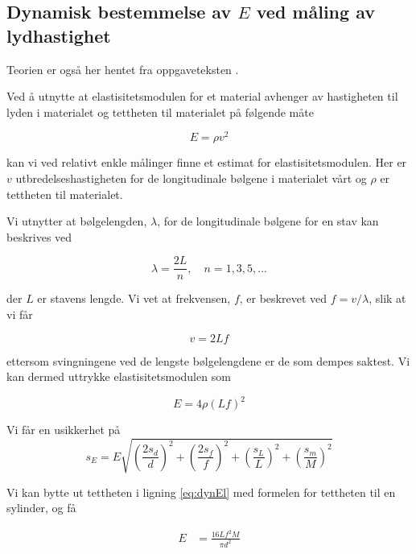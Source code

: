 \documentclass[a4paper,11pt, twocolumn]{article}
\begin{document}
\subsection{Dynamisk bestemmelse av $E$ ved måling av lydhastighet}
Teorien er også her hentet fra oppgaveteksten \cite{oppgavetekst}. 

Ved å utnytte at elastisitetsmodulen for et material avhenger av hastigheten til lyden i materialet og tettheten til materialet på følgende måte

\begin{equation}
	E = \rho v^2
	\label{eq:dynamiskElastisitet}
\end{equation}

kan vi ved relativt enkle målinger finne et estimat for elastisitetsmodulen. Her er $v$ utbredelseshastigheten for de longitudinale bølgene i materialet vårt og $\rho$ er tettheten til materialet.

Vi utnytter at bølgelengden, $\lambda$, for de longitudinale bølgene for en stav kan beskrives ved 

\begin{equation}
	\lambda = \frac{2L}{n}, \quad n = 1, 3, 5, \dots
\end{equation}

der $L$ er stavens lengde. Vi vet at frekvensen, $f$, er beskrevet ved $f = v/\lambda$, slik at vi får 

\begin{equation}
	v = 2Lf
\end{equation}

ettersom svingningene ved de lengste bølgelengdene er de som dempes saktest. Vi kan dermed uttrykke elastisitetsmodulen som

\begin{equation}
	E = 4\rho(Lf)^2
	\label{eq:dynEl}
\end{equation}

Vi får en usikkerhet på
\begin{equation}
	s_E = E\sqrt{\left(\frac{2s_d}{d}\right)^2+\left(\frac{2s_f}{f}\right)^2+\left(\frac{s_L}{L}\right)^2+\left(\frac{s_m}{M}\right)^2}	
	\label{eq:feilDynamisk}
\end{equation}

Vi kan bytte ut tettheten i ligning \eqref{eq:dynEl} med formelen for tettheten til en sylinder, og få

\begin{align}
	E &= \frac{16Lf^2M}{\pi d^2}
\end{align}
\end{document}
